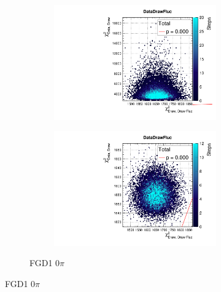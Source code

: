 \begin{figure}[h]
\begin{subfigure}[t]{\textwidth}
\begin{subfigure}[t]{0.24\textwidth}
\includegraphics[width=\textwidth, trim={0mm 0mm 0mm 8mm}, clip,page=11]{figures/mach3/data/priorpred/2017b_NewDet_3Xsec_4Det_5Flux_NewXSecTune_Data_merge_PriorPred_procs}
\end{subfigure}
	\begin{subfigure}[t]{0.24\textwidth}
		\includegraphics[width=\textwidth, trim={0mm 0mm 0mm 8mm}, clip,page=11]{figures/mach3/data/postpred/2017b_NewData_NewDet_UpdXsecStep_2Xsec_4Det_5Flux_0_PostPred_procs}
	\end{subfigure}
\caption{FGD1 0$\pi$}
\end{subfigure}
	

\end{figure}
